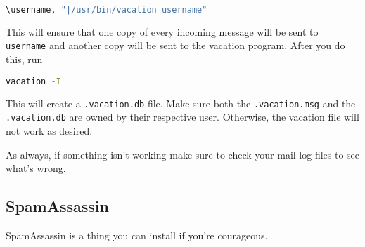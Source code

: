 \documentclass{article}
\begin{document}
\begin{lstlisting}[basicstyle=\ttfamily, backgroundcolor = \color{lightgray}, language = bash, xleftmargin = 0cm, framexleftmargin = 1em]
\username, "|/usr/bin/vacation username"
\end{lstlisting}

This will ensure that one copy of every incoming message will be sent to \verb|username| and another copy will be sent to the vacation program. After you do this, run

\begin{lstlisting}[basicstyle=\ttfamily, backgroundcolor = \color{lightgray}, language = bash, xleftmargin = 0cm, framexleftmargin = 1em]
vacation -I
\end{lstlisting}

This will create a \verb|.vacation.db| file. Make sure both the \verb|.vacation.msg| and the \verb|.vacation.db| are owned by their respective user. Otherwise, the vacation file will not work as desired.

As always, if something isn't working make sure to check your mail log files to see what's wrong. 


\subsection*{SpamAssassin}

SpamAssassin is a thing you can install if you're courageous. 
\end{document}
